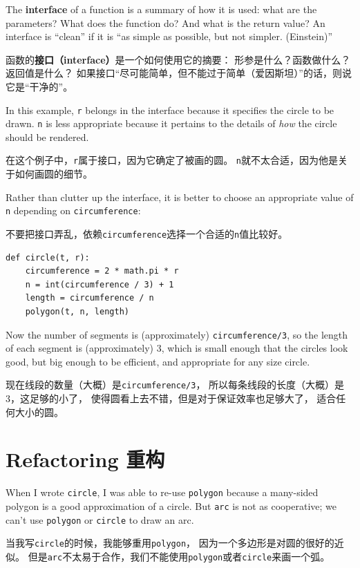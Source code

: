 \documentclass[10pt]{book}
\begin{document}
\begin{CJK}{UTF8}{gbsn}
The {\bf interface} of a function is a summary of how it is used: what
are the parameters?  What does the function do?  And what is the return
value?  An interface is ``clean'' if it is ``as simple as
possible, but not simpler. (Einstein)''

函数的{\bf 接口（interface）}是一个如何使用它的摘要：
形参是什么？函数做什么？返回值是什么？
如果接口``尽可能简单，但不能过于简单（爱因斯坦）''的话，则说它是``干净的''。

In this example, {\tt r} belongs in the interface because it
specifies the circle to be drawn.  {\tt n} is less appropriate
because it pertains to the details of {\em how} the circle should
be rendered.

在这个例子中，{\tt r}属于接口，因为它确定了被画的圆。
{\tt n}就不太合适，因为他是关于如何画圆的细节。

Rather than clutter up the interface, it is better
to choose an appropriate value of {\tt n}
depending on {\tt circumference}:

不要把接口弄乱，依赖{\tt circumference}选择一个合适的{\tt n}值比较好。

\begin{verbatim}
def circle(t, r):
    circumference = 2 * math.pi * r
    n = int(circumference / 3) + 1
    length = circumference / n
    polygon(t, n, length)
\end{verbatim}
%
Now the number of segments is (approximately) {\tt circumference/3},
so the length of each segment is (approximately) 3, which is small
enough that the circles look good, but big enough to be efficient,
and appropriate for any size circle.

现在线段的数量（大概）是{\tt circumference/3}，
所以每条线段的长度（大概）是3，这足够的小了，
使得圆看上去不错，但是对于保证效率也足够大了，
适合任何大小的圆。

\section{Refactoring 重构}
\label{refactoring}

When I wrote {\tt circle}, I was able to re-use {\tt polygon}
because a many-sided polygon is a good approximation of a circle.
But {\tt arc} is not as cooperative; we can't use {\tt polygon}
or {\tt circle} to draw an arc.

当我写{\tt circle}的时候，我能够重用{\tt polygon}，
因为一个多边形是对圆的很好的近似。
但是{\tt arc}不太易于合作，我们不能使用{\tt polygon}或者{\tt circle}来画一个弧。


\end{CJK}
\end{document}
